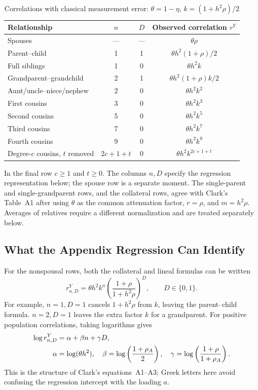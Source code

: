 \begin{table}[htbp]
\centering
\caption{Correlations with classical measurement error:
$\theta=1-\eta$, $k=(1+h^2\rho)/2$}
\label{tab:measurement-moments}
\begin{tabular}{lccc}
\hline
Relationship & $n$ & $D$ & Observed correlation $r^Y$\\
\hline
Spouses & --- & --- & $\theta\rho$\\
Parent--child & 1 & 1 & $\theta h^2(1+\rho)/2$\\
Full siblings & 1 & 0 & $\theta h^2k$\\
Grandparent--grandchild & 2 & 1 & $\theta h^2(1+\rho)k/2$\\
Aunt/uncle--niece/nephew & 2 & 0 & $\theta h^2k^2$\\
First cousins & 3 & 0 & $\theta h^2k^3$\\
Second cousins & 5 & 0 & $\theta h^2k^5$\\
Third cousins & 7 & 0 & $\theta h^2k^7$\\
Fourth cousins & 9 & 0 & $\theta h^2k^9$\\
Degree-$c$ cousins, $t$ removed & $2c+1+t$ & 0
 & $\theta h^2k^{2c+1+t}$\\
\hline
\end{tabular}
\end{table}
In the final row $c\geq1$ and $t\geq0$. The columns $n,D$ specify the
regression representation below; the spouse row is a separate moment.
The single-parent and single-grandparent rows, and the collateral rows,
agree with Clark's Table~A1 after using $\theta$ as the common attenuation factor,
$r=\rho$, and $m=h^2\rho$. Averages of relatives require a different
normalization and are treated separately below.

\subsection{What the Appendix Regression Can Identify}
\label{sec:me-identification}

For the nonspousal rows, both the collateral and lineal formulas can
be written
\begin{equation}
 r^Y_{n,D}
 =\theta h^2 k^n
  \left(\frac{1+\rho}{1+h^2\rho}\right)^D,\qquad D\in\{0,1\}.
 \label{eq:me-regression-moment}
\end{equation}
For example, $n=1,D=1$ cancels $1+h^2\rho$ from $k$, leaving the
parent--child formula. $n=2,D=1$ leaves the extra factor $k$ for a
grandparent. For positive population correlations, taking logarithms gives
\begin{align}
 \log r^Y_{n,D}&=\alpha+\beta n+\gamma D,\notag\\
 \alpha&=\log(\theta h^2),\quad
 \beta=\log\left(\frac{1+\rho_A}{2}\right),\quad
 \gamma=\log\left(\frac{1+\rho}{1+\rho_A}\right).
 \label{eq:me-log-regression}
\end{align}
This is the structure of Clark's equations~A1--A3; Greek letters here
avoid confusing the regression intercept with the loading $a$.

